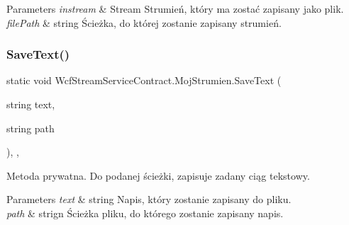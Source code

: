 \begin{DoxyParams}{Parameters}
{\em instream} & Stream Strumień, który ma zostać zapisany jako plik.\\
\hline
{\em file\+Path} & string Ścieżka, do której zostanie zapisany strumień.\\
\hline
\end{DoxyParams}
\mbox{\label{class_wcf_stream_service_contract_1_1_moj_strumien_ae8467c3fc2f5c144b588e98bdbf6d0a5}} 
\subsubsection{\texorpdfstring{Save\+Text()}{SaveText()}}
{\footnotesize\ttfamily static void Wcf\+Stream\+Service\+Contract.\+Moj\+Strumien.\+Save\+Text (\begin{DoxyParamCaption}\item[{string}]{text,  }\item[{string}]{path }\end{DoxyParamCaption})\hspace{0.3cm}{\ttfamily [inline]}, {\ttfamily [static]}, {\ttfamily [private]}}



Metoda prywatna. Do podanej ścieżki, zapisuje zadany ciąg tekstowy. 


\begin{DoxyParams}{Parameters}
{\em text} & string Napis, który zostanie zapisany do pliku.\\
\hline
{\em path} & strign Ścieżka pliku, do którego zostanie zapisany napis.\\
\hline
\end{DoxyParams}
\mbox{\label{class_wcf_stream_service_contract_1_1_moj_strumien_a436badd7f8eba36f5f6aae8466ae7416}} 
